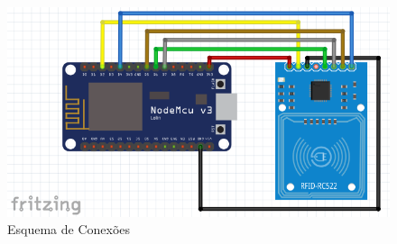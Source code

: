 \begin{figure}[H]
              \caption{\label{fig:esq_conexoes}{Esquema de Conexões}}
              \centering
              \includegraphics[width=1\textwidth]{Figuras/esquema_nodemcu_rc522.PNG}
\end{figure}

